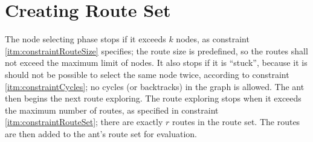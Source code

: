 \section{Creating Route Set}
The node selecting phase stops if it exceeds $k$ nodes, as constraint \ref{itm:constraintRouteSize} specifies; the route size is predefined, so the routes shall not exceed the maximum limit of nodes. It also stops if it is ``stuck'', because it is should not be possible to select the same node twice, according to constraint \ref{itm:constraintCycles}; no cycles (or backtracks) in the graph is allowed. The ant then begins the next route exploring. The route exploring stops when it exceeds the maximum number of routes, as specified in constraint \ref{itm:constraintRouteSet}; there are exactly $r$ routes in the route set. The routes are then added to the ant's route set for evaluation.
